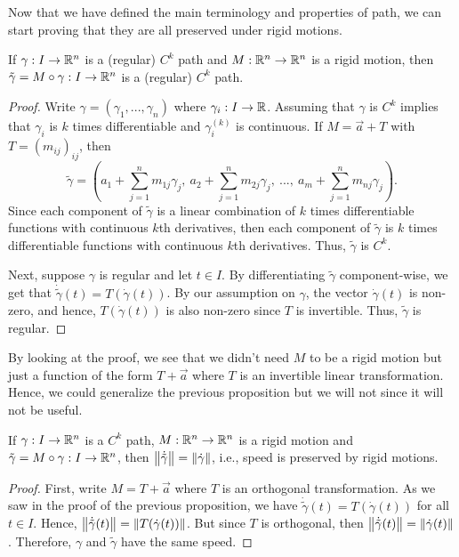 Now that we have defined the main terminology and properties of path, we can start proving that they are all preserved under rigid motions.

\begin{proposition}
    If $\gamma : I \to \mathbb{R}^n$ is a (regular) $C^k$ path and $M : \mathbb{R}^n \to \mathbb{R}^n$ is a rigid motion, then $\tilde{\gamma} = M\circ \gamma : I \to \mathbb{R}^n$ is a (regular) $C^k$ path.
\end{proposition}

\begin{proof}
    Write $\gamma = (\gamma_1, ..., \gamma_n)$ where $\gamma_i : I \to \mathbb{R}$. Assuming that $\gamma$ is $C^k$ implies that $\gamma_i$ is $k$ times differentiable and $\gamma_i^{(k)}$ is continuous. If $M = \vec{a} + T$ with $T = (m_{ij})_{ij}$, then
    $$\tilde{\gamma} = \left(a_1 + \sum_{j=1}^{n}m_{1j}\gamma_j, \ a_2 + \sum_{j=1}^{n}m_{2j}\gamma_j, \ ..., \ a_m + \sum_{j=1}^{n}m_{nj}\gamma_j\right).$$
    Since each component of $\tilde{\gamma}$ is a linear combination of $k$ times differentiable functions with continuous $k$th derivatives, then each component of $\tilde{\gamma}$ is $k$ times differentiable functions with continuous $k$th derivatives. Thus, $\tilde{\gamma}$ is $C^k$.
    
    Next, suppose $\gamma$ is regular and let $t \in I$. By differentiating $\tilde{\gamma}$ component-wise, we get that $\dot{\tilde{\gamma}}(t) = T(\dot{\gamma}(t))$. By our assumption on $\gamma$, the vector $\dot{\gamma}(t)$ is non-zero, and hence, $T(\dot{\gamma}(t))$ is also non-zero since $T$ is invertible. Thus, $\tilde{\gamma}$ is regular.
\end{proof}

By looking at the proof, we see that we didn't need $M$ to be a rigid motion but just a function of the form $T + \vec{a}$ where $T$ is an invertible linear transformation. Hence, we could generalize the previous proposition but we will not since it will not be useful.

\begin{proposition}
    If $\gamma : I \to \mathbb{R}^n$ is a $C^k$ path, $M : \mathbb{R}^n \to \mathbb{R}^n$ is a rigid motion and $\tilde{\gamma} = M\circ \gamma : I \to \mathbb{R}^n$, then $\left\lVert\dot{\tilde{\gamma}} \right\rVert = \left\lVert\dot{\gamma} \right\rVert$, i.e., speed is preserved by rigid motions.
\end{proposition}

\begin{proof}
    First, write $M = T + \vec{a}$ where $T$ is an orthogonal transformation. As we saw in the proof of the previous proposition, we have $\dot{\tilde{\gamma}}(t) = T(\dot{\gamma}(t))$ for all $t \in I$. Hence, $\left\lVert\dot{\tilde{\gamma}}(t) \right\rVert = \left\lVert T(\dot{\gamma}(t)) \right\rVert$. But since $T$ is orthogonal, then $\left\lVert\dot{\tilde{\gamma}}(t) \right\rVert = \left\lVert\dot{\gamma}(t) \right\rVert$. Therefore, $\gamma$ and $\tilde{\gamma}$ have the same speed.
\end{proof}

